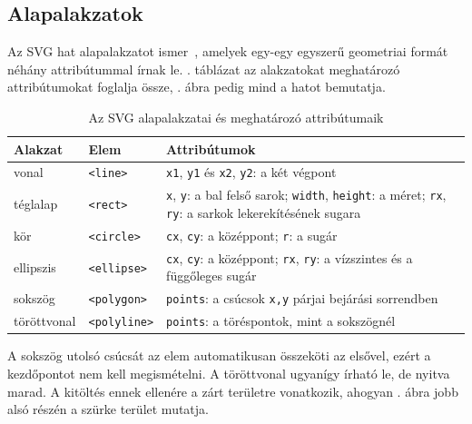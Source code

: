 \subsection{Alapalakzatok}
\label{sub:basic_shapes}

Az SVG hat alapalakzatot ismer~\cite{mdn-svg-elements}, amelyek egy-egy egyszerű geometriai formát néhány attribútummal írnak le. . táblázat az alakzatokat meghatározó attribútumokat foglalja össze, . ábra pedig mind a hatot bemutatja.

\begin{table}[!ht]
\caption{Az SVG alapalakzatai és meghatározó attribútumaik}
\label{tab:basic-shapes}
\centering
\footnotesize
\renewcommand{\arraystretch}{1.2}
\begin{tabular}{|l|l|>{\raggedright\arraybackslash}p{}|}
\hline
\textbf{Alakzat} & \textbf{Elem} & \textbf{Attribútumok} \\ \hline
vonal & \texttt{<line>} & \texttt{x1}, \texttt{y1} és \texttt{x2}, \texttt{y2}: a két végpont \\ \hline
téglalap & \texttt{<rect>} & \texttt{x}, \texttt{y}: a bal felső sarok; \texttt{width}, \texttt{height}: a méret; \texttt{rx}, \texttt{ry}: a sarkok lekerekítésének sugara \\ \hline
kör & \texttt{<circle>} & \texttt{cx}, \texttt{cy}: a középpont; \texttt{r}: a sugár \\ \hline
ellipszis & \texttt{<ellipse>} & \texttt{cx}, \texttt{cy}: a középpont; \texttt{rx}, \texttt{ry}: a vízszintes és a függőleges sugár \\ \hline
sokszög & \texttt{<polygon>} & \texttt{points}: a csúcsok \texttt{x,y} párjai bejárási sorrendben \\ \hline
töröttvonal & \texttt{<polyline>} & \texttt{points}: a töréspontok, mint a sokszögnél \\ \hline
\end{tabular}
\end{table}

A sokszög utolsó csúcsát az elem automatikusan összeköti az elsővel, ezért a kezdőpontot nem kell megismételni. A töröttvonal ugyanígy írható le, de nyitva marad. A kitöltés ennek ellenére a zárt területre vonatkozik, ahogyan . ábra jobb alsó részén a szürke terület mutatja.

